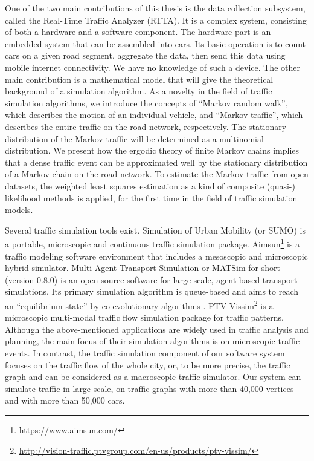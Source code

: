 \documentclass[b5paper,12pt]{report}
\theoremstyle{definition}
\begin{document}
One of the two main contributions of this thesis is the data collection subsystem, called the Real-Time Traffic Analyzer (RTTA). It is a complex system, consisting of both a hardware and a software component. The hardware part is an embedded system that can be assembled into cars. Its basic operation is to count cars on a given road segment, aggregate the data, then send this data using mobile internet connectivity. We have no knowledge of such a device. The other main contribution is a mathematical model that will give the theoretical background of a simulation algorithm. As a novelty in the field of traffic simulation algorithms, we introduce the concepts of \enquote{Markov random walk}, which describes the motion of an individual vehicle, and \enquote{Markov traffic}, which describes the entire traffic on the road network, respectively. The stationary distribution of the Markov traffic will be determined as a multinomial distribution. We present how the ergodic theory of finite Markov chains implies that a dense traffic event can be approximated well by the stationary distribution of a Markov chain on the road network. To estimate the Markov traffic from open datasets, the weighted least squares estimation as a kind of composite (quasi-) likelihood methods is applied, for the first time in the field of traffic simulation models.

Several traffic simulation tools exist. Simulation of Urban Mobility \cite{SUMO2012} (or SUMO) is a portable, microscopic and continuous traffic simulation package. Aimsun\footnote{\url{https://www.aimsun.com/}} is a traffic modeling software environment that includes a mesoscopic and microscopic hybrid simulator. Multi-Agent Transport Simulation \cite{horni2016multi} or MATSim for short (version 0.8.0) is an open source software for large-scale, agent-based transport simulations. Its primary simulation algorithm is queue-based \cite{Charypara} and aims to reach an \enquote{equilibrium state} by co-evolutionary algorithms \cite{popovici2012coevolutionary}. PTV Vissim\footnote{\url{http://vision-traffic.ptvgroup.com/en-us/products/ptv-vissim/}} is a microscopic multi-modal traffic flow simulation package for traffic patterns. Although the above-mentioned applications are widely used in traffic analysis and planning, the main focus of their simulation algorithms is on microscopic traffic events. In contrast, the traffic simulation component of our software system focuses on the traffic flow of the whole city, or, to be more precise, the traffic graph and can be considered as a macroscopic traffic simulator. Our system can simulate traffic in large-scale, on traffic graphs with more than 40,000 vertices and with more than 50,000 cars.
\end{document}
